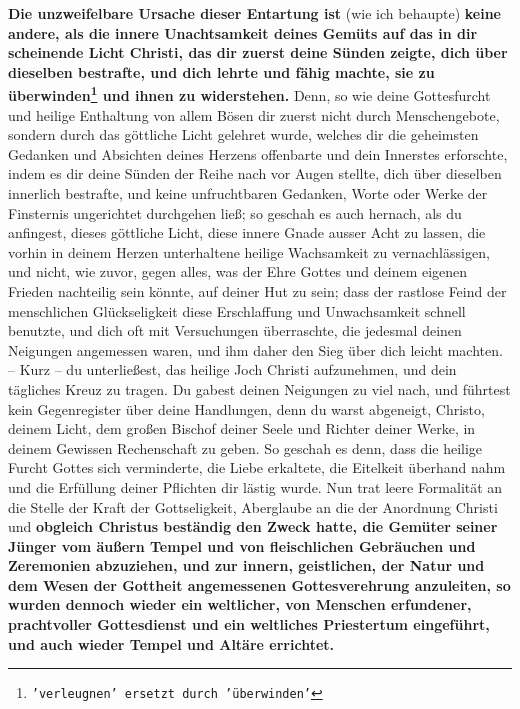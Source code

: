 \label{ref:02_08_ursache_des_abfalls}
\textbf{Die unzweifelbare Ursache dieser Entartung ist} (wie ich behaupte)
\textbf{keine andere,
als die innere Unachtsamkeit deines Gemüts auf das in dir scheinende Licht
Christi, das dir zuerst deine Sünden zeigte, dich über dieselben bestrafte, und
dich lehrte und fähig machte, sie zu überwinden\footnote{\texttt{'verleugnen'
ersetzt durch 'überwinden'}}
und ihnen zu widerstehen.} Denn,
so wie deine Gottesfurcht und heilige Enthaltung von allem Bösen dir zuerst
nicht durch Menschengebote, sondern durch das göttliche Licht gelehret wurde,
welches dir die geheimsten Gedanken und Absichten deines Herzens offenbarte und
dein Innerstes erforschte, indem es dir deine Sünden der Reihe nach vor Augen
stellte, dich über dieselben innerlich bestrafte, und keine unfruchtbaren
Gedanken, Worte oder Werke der Finsternis ungerichtet durchgehen ließ; so
geschah es auch hernach, als du anfingest, dieses göttliche Licht, diese innere
Gnade ausser Acht zu lassen, die vorhin in deinem Herzen unterhaltene heilige
Wachsamkeit zu vernachlässigen, und nicht, wie zuvor, gegen alles, was der Ehre
Gottes und deinem eigenen Frieden nachteilig sein könnte, auf deiner Hut zu
sein; dass der rastlose Feind der menschlichen Glückseligkeit diese
Erschlaffung und Unwachsamkeit schnell benutzte, und dich oft mit Versuchungen
überraschte, die jedesmal deinen Neigungen angemessen waren, und ihm daher den
Sieg über dich leicht machten. -- Kurz -- du unterließest, das heilige Joch
Christi aufzunehmen, und dein tägliches Kreuz zu tragen. Du gabest deinen
Neigungen zu viel nach, und führtest kein Gegenregister über deine Handlungen,
denn du warst abgeneigt, Christo, deinem Licht, dem großen Bischof deiner
Seele und Richter deiner Werke, in deinem Gewissen Rechenschaft zu geben. So
geschah es denn, dass die heilige Furcht Gottes sich verminderte, die Liebe
erkaltete, die Eitelkeit überhand nahm und die Erfüllung deiner Pflichten dir
lästig wurde. Nun trat leere Formalität an die Stelle der Kraft der
Gottseligkeit, Aberglaube an die der Anordnung Christi und
\label{ref:02_08_falscher_gottesdienst} \textbf{obgleich Christus
beständig den Zweck hatte, die Gemüter seiner Jünger vom äußern Tempel und von
fleischlichen Gebräuchen und Zeremonien abzuziehen, und zur innern, geistlichen,
der Natur und dem Wesen der Gottheit angemessenen Gottesverehrung anzuleiten, so
wurden dennoch wieder ein weltlicher, von Menschen erfundener, prachtvoller
Gottesdienst und ein weltliches Priestertum
 eingeführt, und auch wieder Tempel
und Altäre errichtet.}
